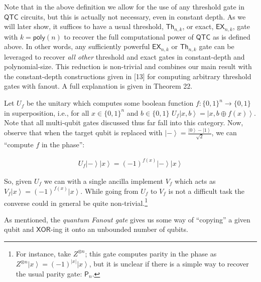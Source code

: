 \documentclass[10pt,a4paper]{article}
\begin{document}
Note that in the above definition we allow for the use of any threshold gate in ${\mathsf{QTC}}$ circuits, but this is actually not necessary, even in constant depth. As we will later show, it suffices to have a usual threshold, $\mathsf{Th}_{n,k}$, or exact, $\mathsf{EX}_{n,k}$, gate with $k={\mathsf{poly}}(n)$ to recover the full computational power of ${\mathsf{QTC}}$ as is defined above. In other words, any sufficiently powerful $\mathsf{EX}_{n,k}$ or $\mathsf{Th}_{n,k}$ gate can be leveraged to recover \emph{all other} threshold and exact gates in constant-depth and polynomial-size. This reduction is non-trivial and combines our main result with the constant-depth constructions given in [13] for computing arbitrary threshold gates with fanout. A full explanation is given in Theorem 22.\par




Let $U_{f}$ be the unitary which computes some boolean function $f:\{0,1\}^{n}\to\{0,1\}$ in superposition, i.e., for all $x\in\{0,1\}^{n}$ and $b\in\{0,1\}$ $U_{f}\left|x,b\right\rangle=\left|x,b\oplus f(x)\right\rangle$. Note that all multi-qubit gates discussed thus far fall into this category. Now, observe that when the target qubit is replaced with $\left|-\right\rangle=\frac{\left|0\right\rangle-\left|1\right\rangle}{\sqrt{2}}$, we can “compute $f$ in the phase”:\par


\[\begin{gathered}
\displaystyle U_{f}\left|-\right\rangle\left|x\right\rangle=(-1)^{f(x)}\left|-\right\rangle\left|x\right\rangle
\end{gathered}\]


So, given $U_{f}$ we can with a single ancilla implement $V_{f}$ which acts as $V_{f}\left|x\right\rangle=(-1)^{f(x)}\left|x\right\rangle$. While going from $U_{f}$ to $V_{f}$ is not a difficult task the converse could in general be quite non-trivial.\footnote{For instance, take $Z^{\otimes n}$; this gate computes parity in the phase as $Z^{\otimes n}\left|x\right\rangle=(-1)^{|x|}\left|x\right\rangle$, but it is unclear if there is a simple way to recover the usual parity gate: $\mathsf{P}_{n}$.}\par




As mentioned, the \emph{quantum Fanout gate} gives us some way of “copying” a given qubit and $\mathsf{XOR}$-ing it onto an unbounded number of qubits.\par
\end{document}
